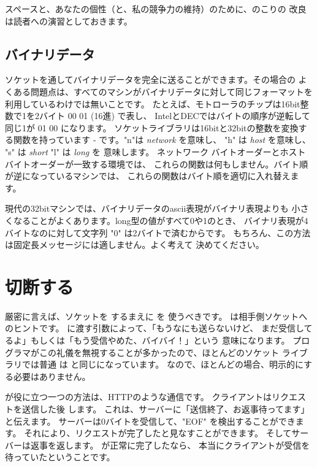\documentclass{howto}
\begin{document}
スペースと、あなたの個性（と、私の競争力の維持）のために、のこりの
改良は読者への演習としておきます。

\subsection{バイナリデータ}

ソケットを通してバイナリデータを完全に送ることができます。その場合の
よくある問題点は、すべてのマシンがバイナリデータに対して同じフォーマットを
利用しているわけでは無いことです。
たとえば、モトローラのチップは16bit整数で1を2バイト 00 01 (16進) で表し、
IntelとDECではバイトの順序が逆転して同じ1が 01 00 になります。
ソケットライブラリは16bitと32bitの整数を変換する関数を持っています -
 です。"n"は \emph{network} を意味し、
"h" は \emph{host} を意味し、 "s" は \emph{short} "l" は \emph{long} を
意味します。
ネットワーク バイトオーダーとホスト バイトオーダーが一致する環境では、
これらの関数は何もしません。バイト順が逆になっているマシンでは、
これらの関数はバイト順を適切に入れ替えます。

現代の32bitマシンでは、バイナリデータのascii表現がバイナリ表現よりも
小さくなることがよくあります。long型の値がすべて0や1のとき、
バイナリ表現が4バイトなのに対して文字列 "0" は2バイトで済むからです。
もちろん、この方法は固定長メッセージには適しません。よく考えて
決めてください。

\section{切断する}

厳密に言えば、ソケットを  するまえに  を
使うべきです。 は相手側ソケットへのヒントです。
 に渡す引数によって、「もうなにも送らないけど、
まだ受信してるよ」もしくは「もう受信やめた、バイバイ！」という
意味になります。
プログラマがこの礼儀を無視することが多かったので、ほとんどのソケット
ライブラリでは普通  は  
と同じになっています。
なので、ほとんどの場合、明示的にする必要はありません。


 が役に立つ一つの方法は、HTTPのような通信です。
クライアントはリクエストを送信した後  します。
これは、サーバーに「送信終了、お返事待ってます」と伝えます。
サーバーは0バイトを受信して、"EOF" を検出することができます。
それにより、リクエストが完了したと見なすことができます。
そしてサーバーは返事を返します。 が正常に完了したなら、
本当にクライアントが受信を待っていたということです。
\end{document}
